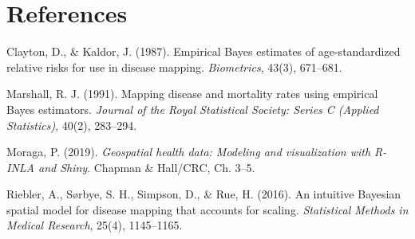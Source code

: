 \documentclass[
  letterpaper,
  DIV=11,
  numbers=noendperiod]{scrartcl}
\begin{document}
\section*{References}\label{references}

Clayton, D., \& Kaldor, J. (1987). Empirical Bayes estimates of
age-standardized relative risks for use in disease mapping.
\emph{Biometrics}, 43(3), 671--681.

Marshall, R. J. (1991). Mapping disease and mortality rates using
empirical Bayes estimators. \emph{Journal of the Royal Statistical
Society: Series C (Applied Statistics)}, 40(2), 283--294.

Moraga, P. (2019). \emph{Geospatial health data: Modeling and
visualization with R-INLA and Shiny}. Chapman \& Hall/CRC, Ch. 3--5.

Riebler, A., Sørbye, S. H., Simpson, D., \& Rue, H. (2016). An intuitive
Bayesian spatial model for disease mapping that accounts for scaling.
\emph{Statistical Methods in Medical Research}, 25(4), 1145--1165.
\end{document}

